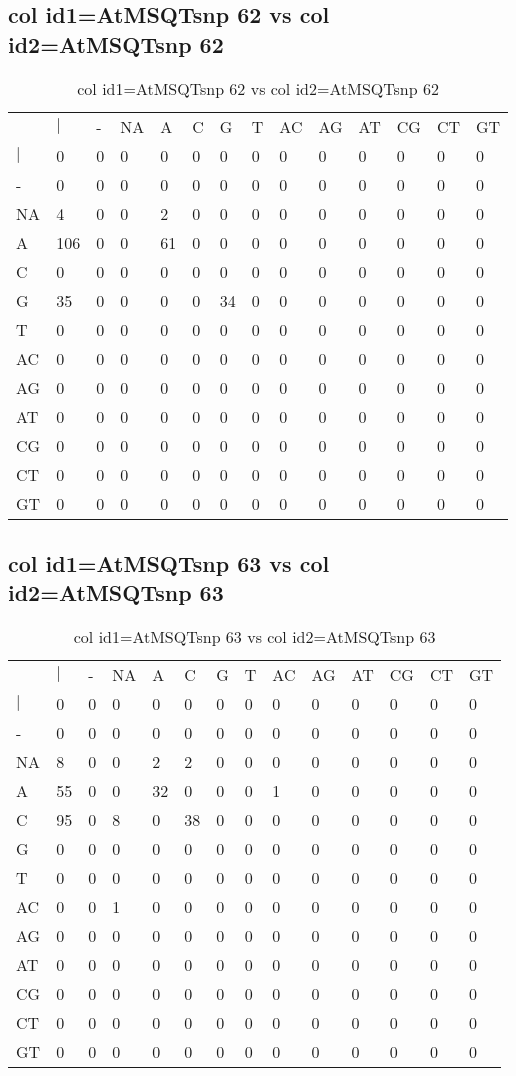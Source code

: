 \subsection{col id1=AtMSQTsnp 62 vs col id2=AtMSQTsnp 62}
\begin{center}
\begin{longtable}{|l|l|l|l|l|l|l|l|l|l|l|l|l|l|}
\caption{col id1=AtMSQTsnp 62 vs col id2=AtMSQTsnp 62} \label{table_dm752}\\
\hline
\\
\hline
&$|$&-&NA&A&C&G&T&AC&AG&AT&CG&CT&GT\\
$|$&0&0&0&0&0&0&0&0&0&0&0&0&0\\
-&0&0&0&0&0&0&0&0&0&0&0&0&0\\
NA&4&0&0&2&0&0&0&0&0&0&0&0&0\\
A&106&0&0&61&0&0&0&0&0&0&0&0&0\\
C&0&0&0&0&0&0&0&0&0&0&0&0&0\\
G&35&0&0&0&0&34&0&0&0&0&0&0&0\\
T&0&0&0&0&0&0&0&0&0&0&0&0&0\\
AC&0&0&0&0&0&0&0&0&0&0&0&0&0\\
AG&0&0&0&0&0&0&0&0&0&0&0&0&0\\
AT&0&0&0&0&0&0&0&0&0&0&0&0&0\\
CG&0&0&0&0&0&0&0&0&0&0&0&0&0\\
CT&0&0&0&0&0&0&0&0&0&0&0&0&0\\
GT&0&0&0&0&0&0&0&0&0&0&0&0&0\\
\hline
\end{longtable}
\end{center}

\subsection{col id1=AtMSQTsnp 63 vs col id2=AtMSQTsnp 63}
\begin{center}
\begin{longtable}{|l|l|l|l|l|l|l|l|l|l|l|l|l|l|}
\caption{col id1=AtMSQTsnp 63 vs col id2=AtMSQTsnp 63} \label{table_dm754}\\
\hline
\\
\hline
&$|$&-&NA&A&C&G&T&AC&AG&AT&CG&CT&GT\\
$|$&0&0&0&0&0&0&0&0&0&0&0&0&0\\
-&0&0&0&0&0&0&0&0&0&0&0&0&0\\
NA&8&0&0&2&2&0&0&0&0&0&0&0&0\\
A&55&0&0&32&0&0&0&1&0&0&0&0&0\\
C&95&0&8&0&38&0&0&0&0&0&0&0&0\\
G&0&0&0&0&0&0&0&0&0&0&0&0&0\\
T&0&0&0&0&0&0&0&0&0&0&0&0&0\\
AC&0&0&1&0&0&0&0&0&0&0&0&0&0\\
AG&0&0&0&0&0&0&0&0&0&0&0&0&0\\
AT&0&0&0&0&0&0&0&0&0&0&0&0&0\\
CG&0&0&0&0&0&0&0&0&0&0&0&0&0\\
CT&0&0&0&0&0&0&0&0&0&0&0&0&0\\
GT&0&0&0&0&0&0&0&0&0&0&0&0&0\\
\hline
\end{longtable}
\end{center}

